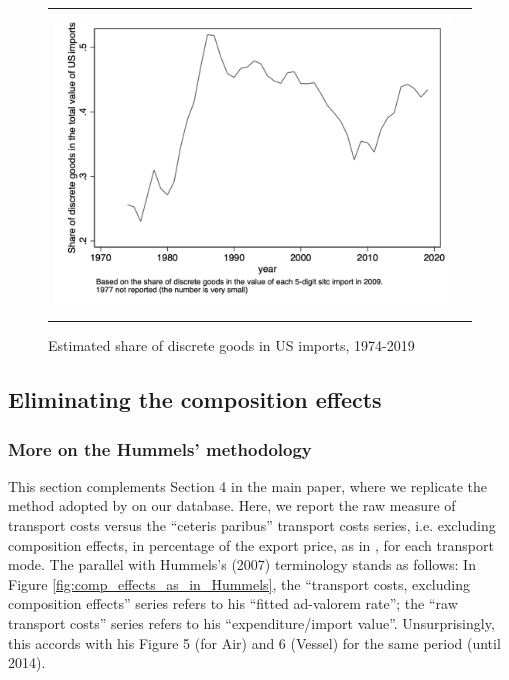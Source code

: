 \documentclass[11pt,twoside, authoryear]{elsarticle}
\begin{document}
\begin{figure}[htbp]
	\caption{Estimated share of discrete goods in US imports, 1974-2019}
	\begin{center}
		\begin{tabular}{cc}
			\includegraphics[height=8cm]{../../revised_article/Share_of_discrete_goods.png}\\
		\end{tabular}
	\end{center}
	\label{graph_Share_of_discrete_goods.png}%
\end{figure}



\setcounter{table}{0}
\renewcommand{\thetable}{E.\arabic{table}}

\setcounter{figure}{0}
\renewcommand{\thefigure}{E.\arabic{figure}}

\subsection{Eliminating the composition effects} \label{sec_oa:comp-effects}

\subsubsection{More on the Hummels' methodology}

This section complements Section 4 in the main paper, where we replicate the method adopted by \cite{hummels2007} on our database. Here, we report the raw measure of transport costs versus the ``ceteris paribus'' transport costs series, i.e. excluding composition effects, in percentage of the export price, as in \cite{hummels2007}, for each transport mode. The parallel with Hummels's (2007) terminology stands as follows: In Figure \ref{fig:comp_effects_as_in_Hummels}, the ``transport costs, excluding composition effects'' series refers to his ``fitted ad-valorem rate''; the ``raw transport costs'' series refers to his ``expenditure/import value''. Unsurprisingly, this accords with his Figure 5 (for Air) and 6 (Vessel) for the same period (until 2014).
\end{document}

